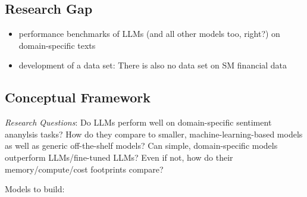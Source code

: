 \subsection{Research Gap}
\begin{itemize}[noitemsep]
	\item performance benchmarks of LLMs (and all other models too, right?) on domain-specific texts
	\item development of a data set: There is also no data set on SM financial data 	
\end{itemize}







\subsection{Conceptual Framework}



\emph{Research Questions}: Do LLMs perform well on domain-specific sentiment ananylsis tasks? How do they compare to smaller, machine-learning-based models as well as generic off-the-shelf models? Can simple, domain-specific models outperform LLMs/fine-tuned LLMs? Even if not, how do their memory/compute/cost footprints compare? 

Models to build:










